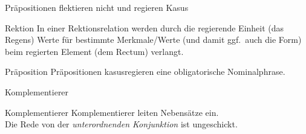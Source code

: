 \begin{frame}
  {Präpositionen flektieren nicht und regieren Kasus}
  \pause
  \begin{exe}
    \ex
    \begin{xlist}
      \pause
      \pause
      \pause
    \end{xlist}
  \end{exe}
  \pause
  \pause
  \pause
  \Zeile
  \begin{block}{Rektion}
    In einer Rektionsrelation werden durch die regierende Einheit (das \alert{Regens}) Werte für bestimmte Merkmale\slash Werte (und damit ggf.\ auch die Form) beim regierten Element (dem \alert{Rectum}) verlangt.\\
  \end{block}
  \Zeile
  \pause
  \begin{block}{Präposition}
    Präpositionen kasusregieren eine obligatorische Nominalphrase.
  \end{block}
\end{frame}

\begin{frame}
  {Komplementierer}
  \pause
  \begin{exe}
    \ex
    \begin{xlist}
    \end{xlist}
  \end{exe}
  \Zeile
  \pause
  \pause
  \pause
  \pause
  \pause
  \pause
  \pause
  \pause
  \pause
  \pause
  \begin{block}{Komplementierer}
    Komplementierer leiten Nebensätze ein.\\
    Die Rede von der \textit{unterordnenden Konjunktion} ist ungeschickt.
  \end{block}
\end{frame}

